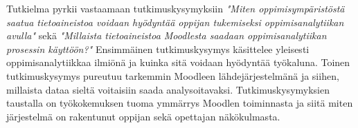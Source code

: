 Tutkielma pyrkii vastaamaan tutkimuskysymyksiin \emph{"Miten oppimisympäristöstä saatua tietoaineistoa voidaan hyödyntää oppijan tukemiseksi oppimisanalytiikan avulla"} sekä \emph{"Millaista tietoaineistoa Moodlesta saadaan oppimisanalytiikan prosessin käyttöön?"} Ensimmäinen tutkimuskysymys käsittelee yleisesti oppimisanalytiikkaa ilmiönä ja kuinka sitä voidaan hyödyntää työkaluna. Toinen tutkimuskysymys pureutuu tarkemmin Moodleen lähdejärjestelmänä ja siihen, millaista dataa sieltä voitaisiin saada analysoitavaksi. Tutkimuskysymyksien taustalla on työkokemuksen tuoma ymmärrys Moodlen toiminnasta ja siitä miten järjestelmä on rakentunut oppijan sekä opettajan näkökulmasta.

